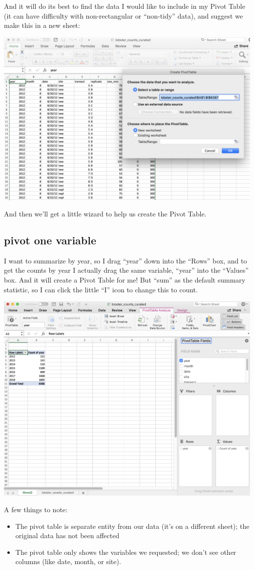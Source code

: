 \documentclass[]{book}
\providecommand{\tightlist}{%
  \setlength{\itemsep}{0pt}\setlength{\parskip}{0pt}}
\begin{document}
And it will do its best to find the data I would like to include in my Pivot Table (it can have difficulty with non-rectangular or ``non-tidy'' data), and suggest we make this in a new sheet:

\includegraphics[width=0.6\linewidth]{img/pivot-table-create}

And then we'll get a little wizard to help us create the Pivot Table.

\hypertarget{pivot-one-variable}{%
\subsection{pivot one variable}\label{pivot-one-variable}}

I want to summarize by year, so I drag ``year'' down into the ``Rows'' box, and to get the counts by year I actually drag the same variable, ``year'' into the ``Values'' box. And it will create a Pivot Table for me! But ``sum'' as the default summary statistic, so I can click the little ``I'' icon to change this to count.

\includegraphics[width=0.6\linewidth]{img/pivot-table-count-year}

A few things to note:

\begin{itemize}
\tightlist
\item
  The pivot table is separate entity from our data (it's on a different sheet); the original data has not been affected
\item
  The pivot table only shows the variables we requested; we don't see other columns (like date, month, or site).
\end{itemize}
\end{document}
